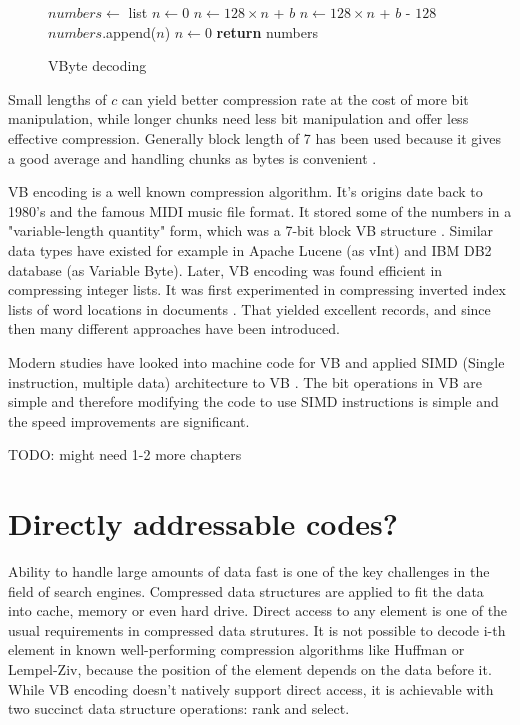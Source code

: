 \begin{figure}[ht]
\begin{algorithmic}
\State $numbers\gets $ list
\State $n\gets 0$
\State $n\gets 128\times n $ + $b$
\Else
\State $n\gets 128\times n $ + $b$ - $128$
\State $numbers$.append($n$)
\State $n\gets 0$
\EndIf
\EndFor
\State \textbf{return} numbers
\EndFunction
\end{algorithmic}
\caption{VByte decoding} \label{vbyte_dec}
\end{figure}

Small lengths of $c$ can yield better compression rate at the cost of more bit manipulation, while longer chunks need less bit manipulation and 
offer less effective compression. Generally block length of 7 has been used because it gives a good average and handling chunks as bytes is 
convenient \citep{Man08}.

VB encoding is a well known compression algorithm. It's origins date back to 1980's and the famous MIDI music file format. It stored some of the numbers
in a "variable-length quantity" form, which was a 7-bit block VB structure \citep{Mid96}. Similar data types have existed for example in Apache Lucene 
(as vInt) and IBM DB2 database (as Variable Byte). Later, VB encoding was found efficient in compressing integer lists. It was first experimented in 
compressing inverted index lists of word locations in documents \citep{Sch02}. That yielded excellent records, and since then many different approaches 
have been introduced. 

Modern studies have looked into machine code for VB and applied SIMD (Single instruction, multiple data) architecture to VB \citep{Lem18,Pla15}. The bit 
operations in VB are simple and therefore modifying the code to use SIMD instructions is simple and the speed improvements are significant. 

TODO: might need 1-2 more chapters


\chapter{Directly addressable codes?}

Ability to handle large amounts of data fast is one of the key challenges in the field of search engines. Compressed data structures are applied to fit the 
data into cache, memory or even hard drive. Direct access to any element is one of the usual requirements in compressed data strutures. It is not possible
to decode i-th element in known well-performing compression algorithms like Huffman or Lempel-Ziv, because the position of the element depends on the data 
before it. While VB encoding doesn't natively support direct access, it is achievable with two succinct data structure operations: rank and select.

